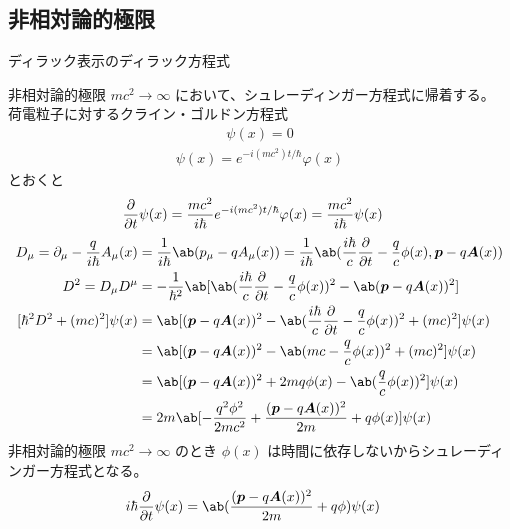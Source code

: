 \documentclass[uplatex,dvipdfmx,a4paper,11pt]{jlreq}
\theoremstyle{definition}
\renewcommand{\AA}{\hat{A}}
\renewcommand{\AA}{\bm{A}}
\newcommand{\pp}{\bm{p}}
\numberwithin{equation}{section}
\begin{document}
\subsection{非相対論的極限}
ディラック表示のディラック方程式


非相対論的極限 $mc^2\to\infty$ において、シュレーディンガー方程式に帰着する。
荷電粒子に対するクライン・ゴルドン方程式
\begin{align}
  [\hbar^2D^2 + (mc)^2]\psi(x) = 0
\end{align}
\begin{align}
  \psi(x) = e^{-i(mc^2)t/\hbar}\varphi(x)
\end{align}
とおくと
\begin{align}
  \diffp{}{t}\psi(x) & = \frac{mc^2}{i\hbar}e^{-i(mc^2)t/\hbar}\varphi(x) = \frac{mc^2}{i\hbar}\psi(x)
\end{align}
\begin{align}
  D_\mu = \partial_\mu - \frac{q}{i\hbar}A_\mu(x) & = \frac{1}{i\hbar}\ab(p_\mu - qA_\mu(x)) = \frac{1}{i\hbar}\ab(\frac{i\hbar}{c}\diffp{}{t} - \frac{q}{c}\phi(x), \pp - q\AA(x)) \\
  D^2 = D_\mu D^\mu                               & = -\frac{1}{\hbar^2}\ab[\ab(\frac{i\hbar}{c}\diffp{}{t} - \frac{q}{c}\phi(x))^2 - \ab(\pp - q\AA(x))^2]                         \\
  [\hbar^2D^2 + (mc)^2]\psi(x)                    & = \ab[(\pp - q\AA(x))^2 - \ab(\frac{i\hbar}{c}\diffp{}{t} - \frac{q}{c}\phi(x))^2 + (mc)^2]\psi(x)                              \\
                                                  & = \ab[(\pp - q\AA(x))^2 - \ab(mc - \frac{q}{c}\phi(x))^2 + (mc)^2]\psi(x)                                                       \\
                                                  & = \ab[(\pp - q\AA(x))^2 + 2mq\phi(x) - \ab(\frac{q}{c}\phi(x))^2]\psi(x)                                                        \\
                                                  & = 2m\ab[-\frac{q^2\phi^2}{2mc^2} + \frac{(\pp - q\bm{A}(x))^2}{2m} + q\phi(x)]\psi(x)
\end{align}
非相対論的極限 $mc^2\to\infty$ のとき $\phi(x)$ は時間に依存しないからシュレーディンガー方程式となる。
\begin{align}
  i\hbar\diffp{}{t}\psi(x) & = \ab(\frac{(\pp - q\bm{A}(x))^2}{2m} + q\phi)\psi(x)
\end{align}
\end{document}
